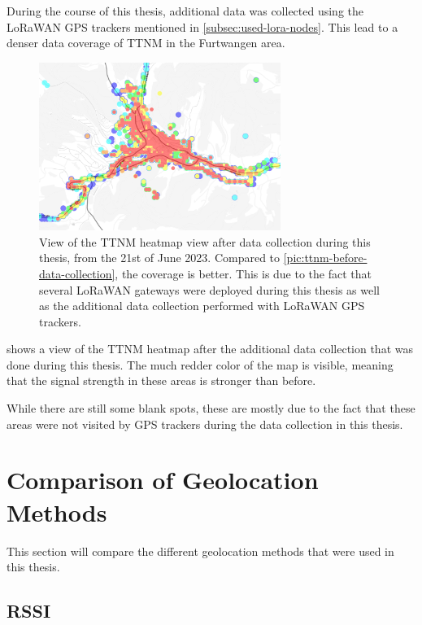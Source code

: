 During the course of this thesis, additional data was collected using the \ac{LoRaWAN} \ac{GPS} trackers mentioned in \cref{subsec:used-lora-nodes}.
This lead to a denser data coverage of \acl{TTNM} in the Furtwangen area.

\begin{figure}[htbp]
    \centering
    \includegraphics[width=0.7\textwidth]{pictures/ttn-mapper/ttnm_heatmap_after_data_collection.jpg}
    \caption{
        View of the \ac{TTNM} heatmap view after data collection during this thesis, from the 21st of June 2023.
        Compared to \cref{pic:ttnm-before-data-collection}, the coverage is better.
        This is due to the fact that several \ac{LoRaWAN} gateways were deployed during this thesis as well as the additional data collection performed with \ac{LoRaWAN} \ac{GPS} trackers.
    }\label{pic:ttnm-heatmap-after-data-collection}
\end{figure}

 shows a view of the \ac{TTNM} heatmap after the additional data collection that was done during this thesis.
The much redder color of the map is visible, meaning that the signal strength in these areas is stronger than before.

While there are still some blank spots, these are mostly due to the fact that these areas were not visited by \ac{GPS} trackers during the data collection in this thesis.

\section{Comparison of Geolocation Methods}

This section will compare the different geolocation methods that were used in this thesis.

\subsection{\acf{RSSI}}


